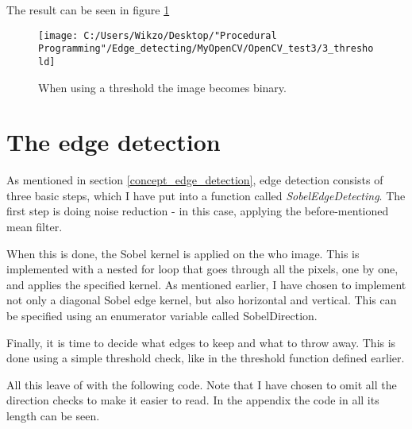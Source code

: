 The result can be seen in figure \ref{threshold}

\begin{figure} [htbp]
\texttt{[image: C:/Users/Wikzo/Desktop/"Procedural Programming"/Edge\_detecting/MyOpenCV/OpenCV\_test3/3\_threshold]}
\centering
\caption{When using a threshold the image becomes binary.}
\label{threshold}
\end{figure}

\section{The edge detection}
As mentioned in section \ref{concept_edge_detection}, edge detection consists of three basic steps, which I have put into a function called \textit{SobelEdgeDetecting}. The first step  is doing noise reduction - in this case, applying the before-mentioned mean filter.

When this is done, the Sobel kernel is applied on the who image. This is implemented with a nested for loop that goes through all the pixels, one by one, and applies the specified kernel. As mentioned earlier, I have chosen to implement not only a diagonal Sobel edge kernel, but also horizontal and vertical. This can be specified using an enumerator variable called SobelDirection.

Finally, it is time to decide what edges to keep and what to throw away. This is done using a simple threshold check, like in the threshold function defined earlier.

All this leave of with the following code. Note that I have chosen to omit all the direction checks to make it easier to read. In the appendix the code in all its length can be seen.

